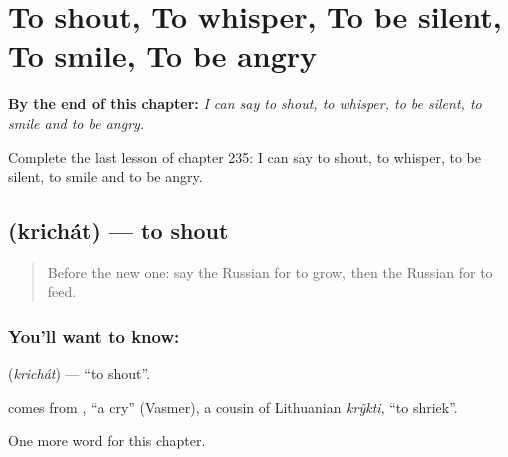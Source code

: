 
\chapter{To shout, To whisper, To be silent, To smile, To be angry}
\label{ch:ru-to-shout-to-whisper-to-be-silent-to-smile-to-be-angry}

\begin{chapteropening}
\textbf{By the end of this chapter:} \emph{I can say to shout, to whisper, to be silent, to smile and to be angry.}

Complete the last lesson of chapter 235: I can say to shout, to whisper, to be silent, to smile and to be angry.
\end{chapteropening}

\section[\texorpdfstring{\ru{кричать} (krichát)}{кричать (krichát)}]{ (krichát) — to shout}

\label{lesson:RU-C235-krichat}



\begin{quote}
Before the new one: say the Russian for to grow, then the Russian for to feed.
\end{quote}

\subsection*{You'll want to know: }
\textbf{} (\emph{krichát}) — \textquotedblleft{}to shout\textquotedblright{}.

\begin{cousinweb}
\textbf{} comes from \emph{}, \textquotedblleft{}a cry\textquotedblright{} (Vasmer), a cousin of Lithuanian \emph{krỹkti}, \textquotedblleft{}to shriek\textquotedblright{}.
\end{cousinweb}

\begin{grammarlens}[title={What you've built}]
One more word for this chapter.
\end{grammarlens}

